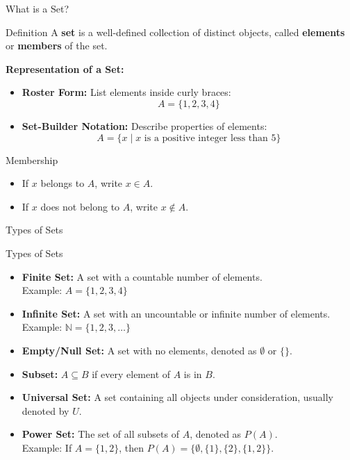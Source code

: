 \documentclass{beamer}
\begin{document}
\begin{frame}{What is a Set?}
  \begin{block}{Definition}
      A \textbf{set} is a well-defined collection of distinct objects, called \textbf{elements} or \textbf{members} of the set.
  \end{block}
  \vspace{10pt}
  \textbf{Representation of a Set:}
  \begin{itemize}
      \item \textbf{Roster Form:} List elements inside curly braces:
      \[
      A = \{1, 2, 3, 4\}
      \]
      \item \textbf{Set-Builder Notation:} Describe properties of elements:
      \[
      A = \{x \mid x \text{ is a positive integer less than 5}\}
      \]
  \end{itemize}
  \vspace{10pt}
  \begin{block}{Membership}
      \begin{itemize}
          \item If \(x\) belongs to \(A\), write \(x \in A\).
          \item If \(x\) does not belong to \(A\), write \(x \notin A\).
      \end{itemize}
  \end{block}
\end{frame}
\begin{frame}{Types of Sets}
  \begin{block}{Types of Sets}
      \begin{itemize}
          \item \textbf{Finite Set:} A set with a countable number of elements. \\
          Example: \(A = \{1, 2, 3, 4\}\)
          
          \item \textbf{Infinite Set:} A set with an uncountable or infinite number of elements. \\
          Example: \(\mathbb{N} = \{1, 2, 3, \dots\}\)

          \item \textbf{Empty/Null Set:} A set with no elements, denoted as \(\emptyset\) or \(\{\}\).

          \item \textbf{Subset:} \(A \subseteq B\) if every element of \(A\) is in \(B\).

          \item \textbf{Universal Set:} A set containing all objects under consideration, usually denoted by \(U\).

          \item \textbf{Power Set:} The set of all subsets of \(A\), denoted as \(P(A)\). \\
          Example: If \(A = \{1, 2\}\), then \(P(A) = \{\emptyset, \{1\}, \{2\}, \{1, 2\}\}\).
      \end{itemize}
  \end{block}
\end{frame}
\end{document}
